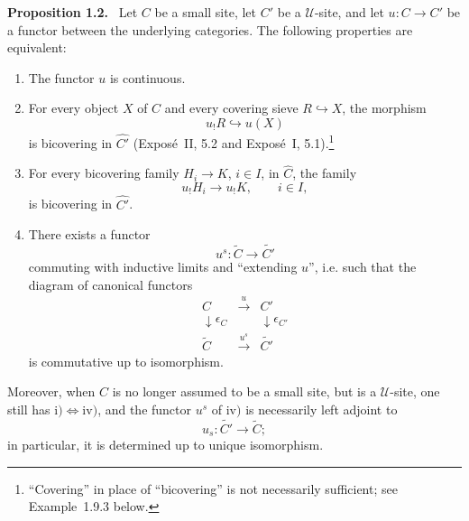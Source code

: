 \documentclass[11pt]{article}
\newcommand{\U}{\mathcal{U}}
\newenvironment{statement}[1]{\par\medskip\noindent\textbf{#1.}\ }{\par\medskip}
\begin{document}
\begin{statement}{Proposition 1.2}
Let \(C\) be a small site, let \(C'\) be a \(\U\)-site, and let \(u:C\to C'\) be a functor between the underlying categories. The following properties are equivalent:
\begin{enumerate}[label=\roman*)]
\item The functor \(u\) is continuous.

\item For every object \(X\) of \(C\) and every covering sieve \(R\hookrightarrow X\), the morphism
\[
u_!R\hookrightarrow u(X)
\]
is bicovering in \(\widehat{C'}\) (Expos\'e~II, 5.2 and Expos\'e~I, 5.1).\footnote{``Covering'' in place of ``bicovering'' is not necessarily sufficient; see Example~1.9.3 below.}

\item For every bicovering family \(H_i\to K\), \(i\in I\), in \(\widehat C\), the family
\[
u_!H_i\longrightarrow u_!K,
\qquad i\in I,
\]
is bicovering in \(\widehat{C'}\).

\item There exists a functor
\[
u^s:\widetilde C\longrightarrow \widetilde{C'}
\]
commuting with inductive limits and ``extending \(u\)'', i.e. such that the diagram of canonical functors
\[
\begin{array}{ccc}
C & \xrightarrow{u} & C'\\
\downarrow\epsilon_C && \downarrow\epsilon_{C'}\\
\widetilde C & \xrightarrow{u^s} & \widetilde{C'}
\end{array}
\]
is commutative up to isomorphism.
\end{enumerate}
Moreover, when \(C\) is no longer assumed to be a small site, but is a \(\U\)-site, one still has \(\mathrm{i})\Leftrightarrow\mathrm{iv})\), and the functor \(u^s\) of \(\mathrm{iv})\) is necessarily left adjoint to
\[
u_s:\widetilde{C'}\longrightarrow\widetilde C;
\]
in particular, it is determined up to unique isomorphism.
\end{statement}
\end{document}
